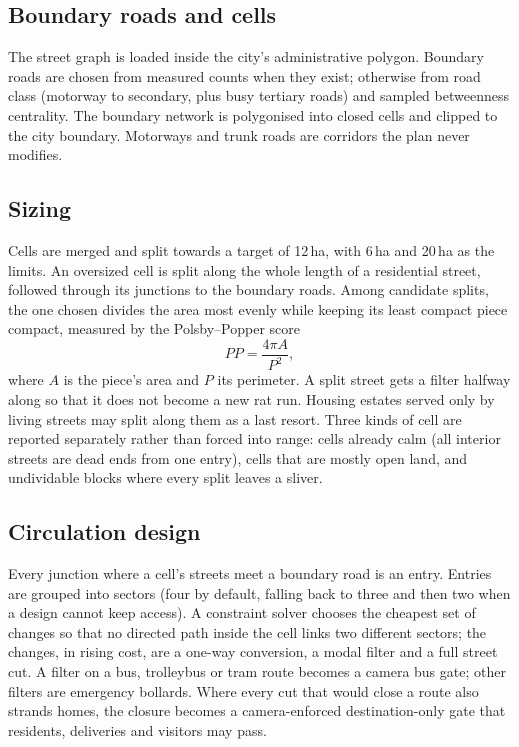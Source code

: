 \documentclass[11pt,a4paper]{article}
\begin{document}
\subsection{Boundary roads and cells}
The street graph is loaded inside the city's administrative polygon. Boundary roads are chosen from measured counts when they exist; otherwise from road class (motorway to secondary, plus busy tertiary roads) and sampled betweenness centrality. The boundary network is polygonised into closed cells and clipped to the city boundary. Motorways and trunk roads are corridors the plan never modifies.

\subsection{Sizing}
Cells are merged and split towards a target of 12\,ha, with 6\,ha and 20\,ha as the limits. An oversized cell is split along the whole length of a residential street, followed through its junctions to the boundary roads. Among candidate splits, the one chosen divides the area most evenly while keeping its least compact piece compact, measured by the Polsby--Popper score \citep{polsby1991}
\begin{equation}
  PP = \frac{4\pi A}{P^{2}},
\end{equation}
where $A$ is the piece's area and $P$ its perimeter. A split street gets a filter halfway along so that it does not become a new rat run. Housing estates served only by living streets may split along them as a last resort. Three kinds of cell are reported separately rather than forced into range: cells already calm (all interior streets are dead ends from one entry), cells that are mostly open land, and undividable blocks where every split leaves a sliver.

\subsection{Circulation design}
Every junction where a cell's streets meet a boundary road is an entry. Entries are grouped into sectors (four by default, falling back to three and then two when a design cannot keep access). A constraint solver chooses the cheapest set of changes so that no directed path inside the cell links two different sectors; the changes, in rising cost, are a one-way conversion, a modal filter and a full street cut. A filter on a bus, trolleybus or tram route becomes a camera bus gate; other filters are emergency bollards. Where every cut that would close a route also strands homes, the closure becomes a camera-enforced destination-only gate that residents, deliveries and visitors may pass.
\end{document}
